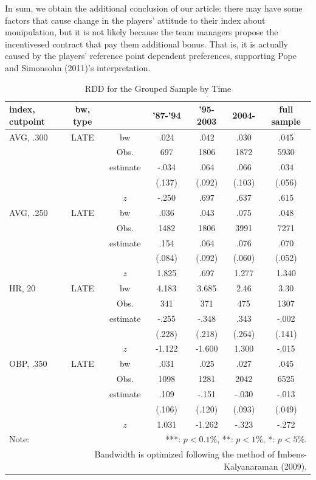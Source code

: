 \documentclass[dvipdfmx, 12pt]{article}
\begin{document}
In sum, we obtain the additional conclusion of our article: there may have some factors that cause change in the players' attitude to their index about monipulation, but it is not likely because the team managers propose the incentivesed contract that pay them additional bonus. That is, it is actually caused by the players' reference point dependent preferences, supporting Pope and Simonsohn (2011)'s interpretation.

\begin{table}[H]
  \centering
  \caption{RDD for the Grouped Sample by Time}
  \label{RDD_Era}
  \footnotesize
  \begin{tabular}{lcccccc} \hline
    index, cutpoint & bw, type &  &'87-'94 & '95-2003 & 2004- &full sample \\ \hline \hline
    AVG, .300 & LATE & bw & .024 & .042 & .030 & .045 \\
    &  & Obs. & 697 & 1806 & 1872 & 5930 \\
    &  & estimate & -.034 & .064 & .066 & .034 \\
    &  & & (.137) & (.092) & (.103) & (.056) \\
    & & $z$ & -.250 & .697 & .637 & .615 \\ \hline
    AVG, .250 & LATE & bw & .036 & .043 &.075 & .048 \\
    &  & Obs. & 1482 & 1806 & 3991 & 7271 \\
    &  & estimate & .154 & .064 & .076 & .070 \\
    &  & & (.084) & (.092) & (.060) & (.052) \\
    & & $z$ & 1.825 & .697 & 1.277 & 1.340 \\ \hline
    HR, 20 & LATE & bw & 4.183 & 3.685 & 2.46 & 3.30 \\
    &  & Obs. & 341 & 371 & 475 & 1307 \\
    &  & estimate & -.255 & -.348 & .343 & -.002 \\
    &  & & (.228) & (.218) & (.264) & (.141) \\
    & & $z$ & -1.122 & -1.600 & 1.300 & -.015 \\ \hline
    OBP, .350 & LATE & bw & .031 & .025 & .027 & .045 \\
    &  & Obs. & 1098 & 1281 & 2042 & 6525 \\
    &  & estimate & .109 & -.151 & -.030 & -.013 \\
    &  & & (.106) & (.120) & (.093) & (.049) \\
    & & $z$ & 1.031 & -1.262 & -.323 & -.272 \\ \hline
    Note: & \multicolumn{6}{r}{***: $p<0.1\%$, **: $p<1\%$, *: $p<5\%$.} \\
    & \multicolumn{6}{r}{Bandwidth is optimized following the method of Imbens-Kalyanaraman (2009).}
  \end{tabular}
\end{table}
\end{document}
